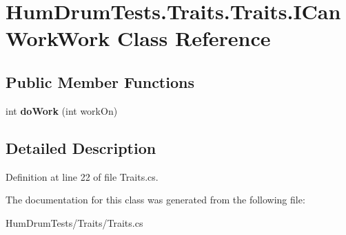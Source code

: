 \hypertarget{classHumDrumTests_1_1Traits_1_1Traits_1_1ICanWorkWork}{}\section{Hum\+Drum\+Tests.\+Traits.\+Traits.\+I\+Can\+Work\+Work Class Reference}
\label{classHumDrumTests_1_1Traits_1_1Traits_1_1ICanWorkWork}
\subsection*{Public Member Functions}
\begin{DoxyCompactItemize}
\item 
\hypertarget{classHumDrumTests_1_1Traits_1_1Traits_1_1ICanWorkWork_abada2c9d54332b2a44bb92149aef0ac1}{}int {\bfseries do\+Work} (int work\+On)\label{classHumDrumTests_1_1Traits_1_1Traits_1_1ICanWorkWork_abada2c9d54332b2a44bb92149aef0ac1}

\end{DoxyCompactItemize}


\subsection{Detailed Description}


Definition at line 22 of file Traits.\+cs.



The documentation for this class was generated from the following file\+:\begin{DoxyCompactItemize}
\item 
Hum\+Drum\+Tests/\+Traits/Traits.\+cs\end{DoxyCompactItemize}
